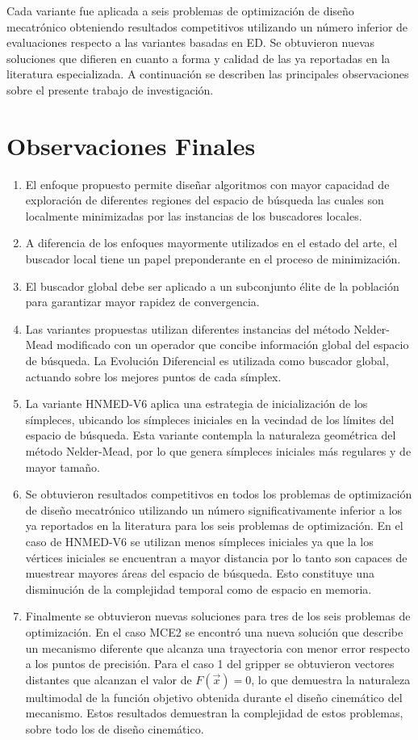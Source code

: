 Cada variante fue aplicada a seis problemas de optimización de diseño mecatrónico obteniendo resultados competitivos utilizando un número inferior de evaluaciones respecto a las variantes basadas en ED. Se obtuvieron nuevas soluciones que difieren en cuanto a forma y calidad de las ya reportadas en la literatura especializada. A continuación se describen las principales observaciones sobre el presente trabajo de investigación.
\section{Observaciones Finales}
\begin{enumerate}
	\item El enfoque propuesto permite diseñar algoritmos con mayor capacidad de exploración de diferentes regiones del espacio de búsqueda las cuales son localmente minimizadas por las instancias de los buscadores locales.
	\item A diferencia de los enfoques mayormente utilizados en el estado del arte, el buscador local tiene un papel preponderante en el proceso de minimización.
	\item El buscador global debe ser aplicado a un subconjunto élite de la población para garantizar mayor rapidez de convergencia.
	 \item Las variantes propuestas utilizan diferentes instancias del método Nelder-Mead modificado con un operador que concibe información global del espacio de búsqueda. La Evolución Diferencial es utilizada como buscador global, actuando sobre los mejores puntos de cada símplex.
	 \item La variante HNMED-V6 aplica una estrategia de inicialización de los símpleces, ubicando los símpleces iniciales en la vecindad de los límites del espacio de búsqueda. Esta variante contempla la naturaleza geométrica del método Nelder-Mead, por lo que genera símpleces iniciales más regulares y de mayor tamaño. 
	 \item Se obtuvieron resultados competitivos en todos los problemas de optimización de diseño mecatrónico utilizando un número significativamente inferior a los ya reportados en la literatura para los seis problemas de optimización. En el caso de HNMED-V6 se utilizan menos símpleces iniciales ya que la los vértices iniciales se encuentran a mayor distancia por lo tanto son capaces de muestrear mayores áreas del espacio de búsqueda. Esto constituye una disminución de la complejidad temporal como de espacio en memoria.
	 \item Finalmente se obtuvieron nuevas soluciones para tres de los seis problemas de optimización. En el  caso MCE2 se encontró una nueva solución que describe un mecanismo diferente que alcanza una trayectoria con menor error respecto a los puntos de precisión. Para el caso 1 del gripper se obtuvieron vectores distantes que alcanzan el valor de $F(\vec{x})=0$, lo que demuestra la naturaleza multimodal de la función objetivo obtenida durante el diseño cinemático del mecanismo. Estos resultados demuestran la complejidad de estos problemas, sobre todo los de diseño cinemático. 
\end{enumerate}  
	 
